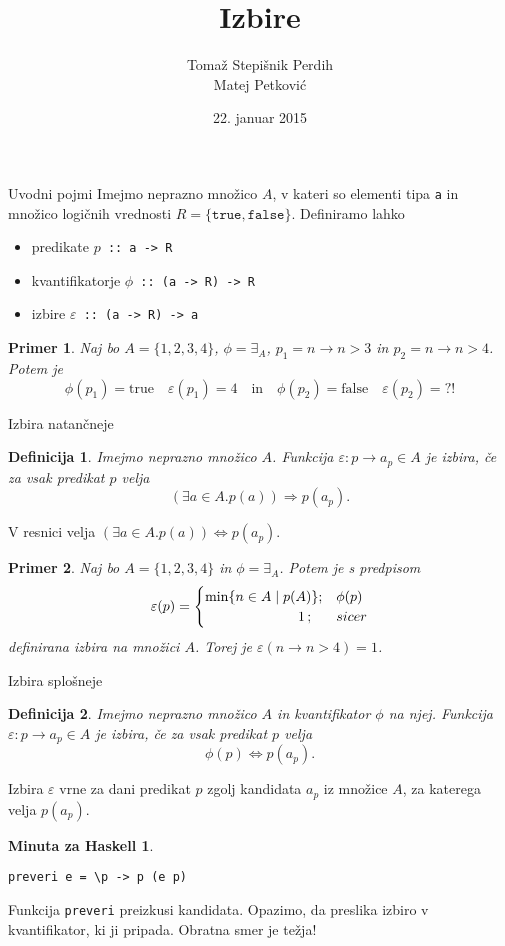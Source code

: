 \documentclass{beamer}
\author[Sintektična sladkorčka]{Tomaž Stepišnik Perdih\\  Matej Petković}
\title{Izbire}
\date{{22. januar 2015}}
\newtheorem{defin}{Definicija}
\newtheorem{koda}{Minuta za Haskell}
\newtheorem{prim}{Primer}
\def\eps{\varepsilon}
\def\obs{\exists}
\begin{document}
\begin{frame}
\titlepage 
\end{frame}

\begin{frame}{Uvodni pojmi}
Imejmo neprazno množico $A$, v kateri so elementi tipa \texttt{a}  in množico logičnih vrednosti $R =  \{ \texttt{true}, \texttt{false}\} $. Definiramo lahko
\begin{itemize}
\item predikate\; $p$\texttt{ :: a -> R}
\item kvantifikatorje\; $\phi$\texttt{ :: (a -> R) -> R}
\item izbire $\varepsilon$\texttt{ :: (a -> R) -> a}
\end{itemize}

\begin{prim}
Naj bo $A = \{1,2,3,4\}$, $\phi = \exists_A$, $p_1 = n \to n > 3$ in $p_2 = n\to n > 4$. Potem je
$$\phi(p_1) = \text{true}\quad\varepsilon (p_1) = 4\quad\text{in}\quad\phi(p_2) = \text{false}\quad\varepsilon (p_2) = \text{?!}$$
\end{prim}

\end{frame}

\begin{frame}{Izbira natančneje}
\begin{defin}
Imejmo neprazno množico $A$. Funkcija $\eps: p \to a_p\in A$ je izbira, če za vsak predikat $p$ velja
$$\left(\obs a\in A. p(a)\right) \Longrightarrow p(a_p)\text{.}$$
\end{defin}
V resnici velja $\left(\obs a\in A. p(a)\right) \Longleftrightarrow p(a_p)$.
\pause
\begin{prim}
Naj bo $A = \{1,2,3,4\}$ in $\phi = \exists_A$. Potem je s predpisom
$$\eps (p) =
\begin{cases}
\min \{ n \in A \mid p(A) \} ;& \phi(p)\\
\hphantom{oooooooooioooo}1\, ;& sicer
\end{cases}
$$
definirana izbira na množici $A$. Torej je $\eps (n \to n > 4) = 1$.
\end{prim}

\end{frame}

\begin{frame}[fragile]{Izbira splošneje}%
\begin{defin}
Imejmo neprazno množico $A$ in kvantifikator $\phi$ na njej. Funkcija $\eps: p \to a_p\in A$ je izbira, če za vsak predikat $p$ velja
$$\phi (p) \Longleftrightarrow p(a_p)\text{.}$$
\end{defin}

Izbira $\eps$ vrne za dani predikat $p$ zgolj kandidata $a_p$ iz množice $A$, za katerega velja $p(a_p)$.
\pause
\begin{koda}
\begin{verbatim}
preveri e = \p -> p (e p)
\end{verbatim}
\end{koda}
Funkcija \texttt{preveri} preizkusi kandidata. Opazimo, da preslika izbiro v kvantifikator, ki ji pripada. Obratna smer je težja!
\end{frame}
\end{document}
